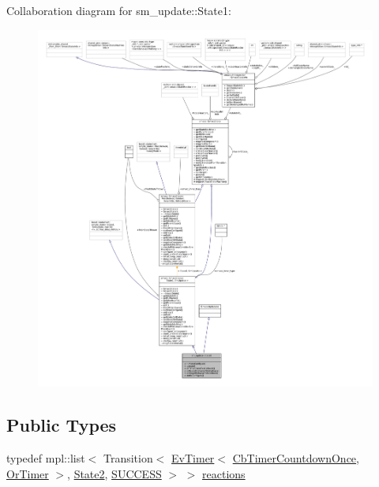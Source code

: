 Collaboration diagram for sm\+\_\+update\+:\+:State1\+:
\nopagebreak
\begin{figure}[H]
\begin{center}
\leavevmode
\includegraphics[width=350pt]{structsm__update_1_1State1__coll__graph}
\end{center}
\end{figure}
\subsection*{Public Types}
\begin{DoxyCompactItemize}
\item 
typedef mpl\+::list$<$ Transition$<$ \hyperlink{structcl__ros__timer__client_1_1EvTimer}{Ev\+Timer}$<$ \hyperlink{classcl__ros__timer__client_1_1CbTimerCountdownOnce}{Cb\+Timer\+Countdown\+Once}, \hyperlink{classsm__update_1_1OrTimer}{Or\+Timer} $>$, \hyperlink{structsm__update_1_1State2}{State2}, \hyperlink{structsmacc_1_1default__transition__tags_1_1SUCCESS}{S\+U\+C\+C\+E\+SS} $>$ $>$ \hyperlink{structsm__update_1_1State1_afecf0d56718ca6d3f567b2abf23641d8}{reactions}
\end{DoxyCompactItemize}
